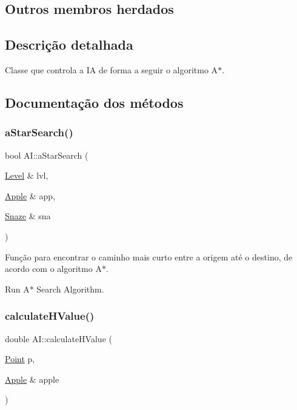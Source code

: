 \subsection*{Outros membros herdados}


\subsection{Descrição detalhada}
Classe que controla a IA de forma a seguir o algoritmo A$\ast$. 

\subsection{Documentação dos métodos}
\mbox{\label{classAI_a9c11e5ad4d67d2afd2b1300189f96faf}} 
\subsubsection{\texorpdfstring{a\+Star\+Search()}{aStarSearch()}}
{\footnotesize\ttfamily bool A\+I\+::a\+Star\+Search (\begin{DoxyParamCaption}\item[{\hyperlink{classLevel}{Level} \&}]{lvl,  }\item[{\hyperlink{classApple}{Apple} \&}]{app,  }\item[{\hyperlink{classSnaze}{Snaze} \&}]{sna }\end{DoxyParamCaption})\hspace{0.3cm}{\ttfamily [private]}}



Função para encontrar o caminho mais curto entre a origem até o destino, de acordo com o algoritmo A$\ast$. 

Run A$\ast$ Search Algorithm. \mbox{\label{classAI_a8984d85c80379ff81776016bfad5101f}} 
\subsubsection{\texorpdfstring{calculate\+H\+Value()}{calculateHValue()}}
{\footnotesize\ttfamily double A\+I\+::calculate\+H\+Value (\begin{DoxyParamCaption}\item[{\hyperlink{structPoint}{Point}}]{p,  }\item[{\hyperlink{classApple}{Apple} \&}]{apple }\end{DoxyParamCaption})\hspace{0.3cm}{\ttfamily [private]}}



